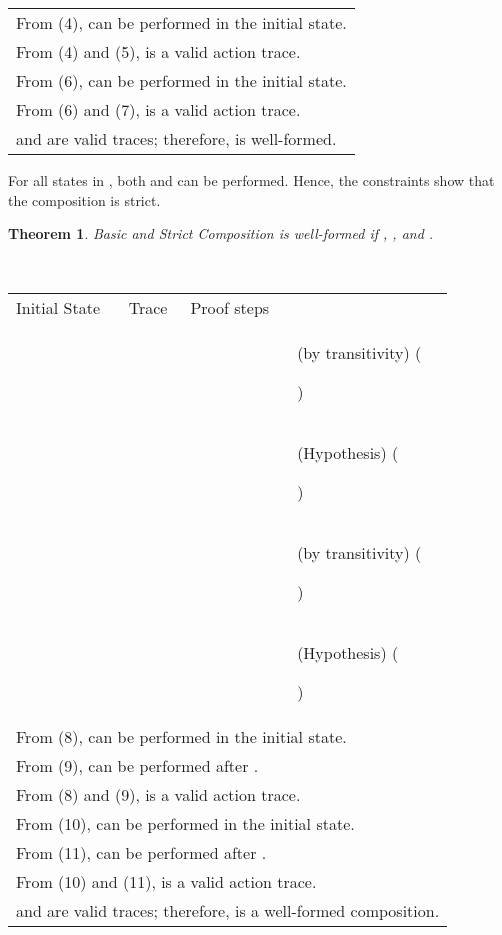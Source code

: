 \documentclass[12pt,journal,letterpaper,onecolumn]{IEEEtran}
\newcounter{myCounter}
\renewcommand{\themyCounter}{\arabic{myCounter}\addtocounter{myCounter}{1}}
\newtheorem{theorem}{Theorem}[section]
\begin{document}
\begin{minipage}{6in} \begin{center}
\begin{tabular}{llp{7.5cm}p{3.8cm}}
\multicolumn{4}{l}{From (4),  can be performed in the initial state.}\\
\multicolumn{4}{l}{From (4) and (5),  is a valid action trace.}\\
\multicolumn{4}{l}{From (6),  can be performed in the initial state.}\\
\multicolumn{4}{l}{From (6) and (7),  is a valid action trace.}\\
\multicolumn{4}{l}{ and  are valid traces; therefore,
 is well-formed.}\\
\end{tabular}
\end{center}
\end{minipage}

For all states in , both  and  can be performed.
Hence, the constraints show that the composition is
strict.\hfill


\begin{theorem}
Basic and Strict Composition   is
well-formed if , ,  and .
\label{theorem:basicstrictconjunction}\end{theorem}
\\
\begin{minipage}{6in} \begin{center}
\begin{tabular}{llp{7.5cm}p{3.8cm}}
Initial State & Trace &  Proof steps & \\
 &  &   & (by transitivity) \hfill(\themyCounter)\\
& & & (Hypothesis) \hfill(\themyCounter)\\ &  &   & (by transitivity) \hfill(\themyCounter)\\
& & & (Hypothesis) \hfill(\themyCounter)\\ \multicolumn{4}{l}{From (8),  can be performed in the initial state.}\\
\multicolumn{4}{l}{From (9),  can be performed after .}\\
\multicolumn{4}{l}{From (8) and (9),  is a valid action trace.}\\
\multicolumn{4}{l}{From (10),  can be performed in the initial state.}\\
\multicolumn{4}{l}{From (11),  can be performed after .} \\
\multicolumn{4}{l}{From (10) and (11),  is a valid action trace.}\\
\multicolumn{4}{l}{ and  are valid traces; therefore,  is a well-formed composition.}\hfill\\
\end{tabular}
\end{center}
\end{minipage}\\
\end{document}
